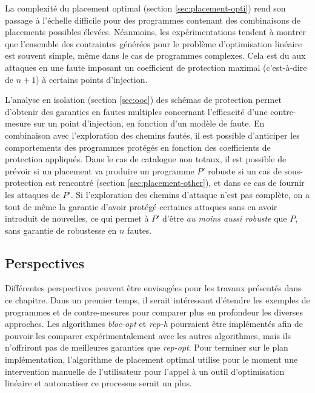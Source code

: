             La complexité du placement optimal (section \ref{sec:placement-opti}) rend son passage à l'échelle difficile pour des programmes contenant des combinaisons de placements possibles élevées. Néanmoins, les expérimentations tendent à montrer que l'ensemble des contraintes générées pour le problème d'optimisation linéaire est souvent simple, même dans le cas de programmes complexes. Cela est du aux attaques en une faute imposant un coefficient de protection maximal (c'est-à-dire de $n + 1$) à certains points d'injection.
            
            L'analyse en isolation (section \ref{sec:ooc}) des schémas de protection permet d'obtenir des garanties en fautes multiples concernant l'efficacité d'une contre-mesure sur un point d'injection, en fonction d'un modèle de faute. En combinaison avec l'exploration des chemins fautés, il est possible d'anticiper les comportements des programmes protégés en fonction des coefficients de protection appliqués.
            Dans le cas de catalogue non totaux, il est possible de prévoir si un placement va produire un programme $P'$ robuste si un cas de sous-protection est rencontré (section \ref{sec:placement-other}), et dans ce cas de fournir les attaques de $P'$.
            Si l'exploration des chemins d'attaque n'est pas complète, on a tout de même la garantie d'avoir protégé certaines attaques sans en avoir introduit de nouvelles, ce qui permet à $P'$ d'être \textit{au moins aussi robuste} que $P$, sans garantie de robustesse en $n$ fautes.
    
        \subsection{Perspectives}
        
            Différentes perspectives peuvent être envisagées pour les travaux présentés dans ce chapitre. Dans un premier temps, il serait intéressant d'étendre les exemples de programmes et de contre-mesures pour comparer plus en profondeur les diverses approches.
            Les algorithmes \textit{bloc-opt} et \textit{rep-h} pourraient être implémentés afin de pouvoir les comparer expérimentalement avec les autres algorithmes, mais ils n'offriront pas de meilleures garanties que \textit{rep-opt}.            
            Pour terminer sur le plan implémentation, l'algorithme de placement optimal utilise pour le moment une intervention manuelle de l'utilisateur pour l'appel à un outil d'optimisation linéaire et automatiser ce processus serait un plus.
            
